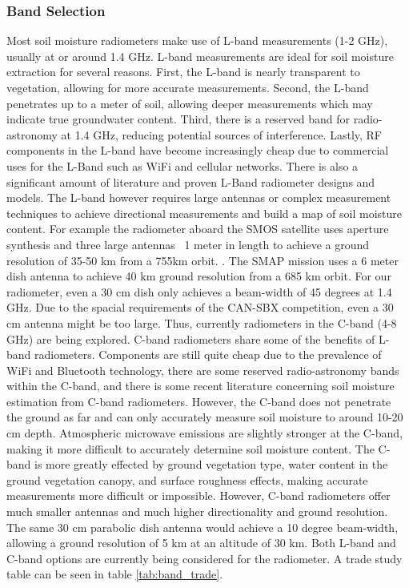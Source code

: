 \documentclass[12pt]{article}
\begin{document}
\subsubsection{Band Selection}

Most soil moisture radiometers make use of L-band measurements (1-2 GHz), usually at or around 1.4 GHz. L-band measurements are ideal for soil moisture extraction for several reasons. First, the L-band is nearly transparent to vegetation, allowing for more accurate measurements. Second, the L-band penetrates up to a meter of soil, allowing deeper measurements which may indicate true groundwater content. Third, there is a reserved band for radio-astronomy at 1.4 GHz, reducing potential sources of interference. Lastly, RF components in the L-band have become increasingly cheap due to commercial uses for the L-Band such as WiFi and cellular networks. There is also a significant amount of literature and proven L-Band radiometer designs and models. The L-band however requires large antennas or complex measurement techniques to achieve directional measurements and build a map of soil moisture content. For example the radiometer aboard the SMOS satellite uses aperture synthesis and three large antennas ~1 meter in length to achieve a ground resolution of 35-50 km from a 755km orbit. \cite{Wigneron2010}. The SMAP mission uses a 6 meter dish antenna to achieve 40 km ground resolution from a 685 km orbit. \cite{entekhabi_njoku_oneill_spencer_jackson_entin_im_kellogg_2008}  For our radiometer, even a 30 cm dish only achieves a beam-width of 45 degrees at 1.4 GHz. Due to the spacial requirements of the CAN-SBX competition, even a 30 cm antenna might be too large. Thus, currently radiometers in the C-band (4-8 GHz) are being explored. C-band radiometers share some of the benefits of L-band radiometers. Components are still quite cheap due to the prevalence of WiFi and Bluetooth technology, there are some reserved radio-astronomy bands within the C-band, and there is some recent literature concerning soil moisture estimation from C-band radiometers. \cite{Description2000,jackson_gasiewski_oldak_klein_njoku_yevgrafov_christiani_bindlish_2002} However, the C-band does not penetrate the ground as far and can only accurately measure soil moisture to around 10-20 cm depth. Atmospheric microwave emissions are slightly stronger at the C-band, making it more difficult to accurately determine soil moisture content. The C-band is more greatly effected by ground vegetation type, water content in the ground vegetation canopy, and surface roughness effects, making accurate measurements more difficult or impossible. \cite{ulaby_fung_moore_1986} However, C-band radiometers offer much smaller antennas and much higher directionality and ground resolution. The same 30 cm parabolic dish antenna would achieve a 10 degree beam-width, allowing a ground resolution of 5 km at an altitude of 30 km. Both L-band and C-band options are currently being considered for the radiometer. A trade study table can be seen in table \ref{tab:band_trade}.
\end{document}
